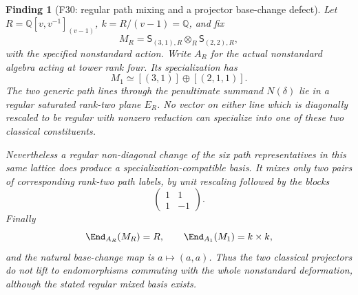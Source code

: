 \documentclass[11pt,a4paper]{article}
\newcommand{\Q}{\mathbb Q}\newcommand{\Z}{\mathbb Z}\newcommand{\C}{\mathbb C}\newcommand{\N}{\mathbb N}\newcommand{\F}{\mathbb F}
\newcommand{\fid}[1]{\textsf{#1}}\newcommand{\gate}[1]{\textsf{#1}}
\theoremstyle{named}\newtheorem{finding}{Finding}[section]
\theoremstyle{definition}\newtheorem{definition}[finding]{Definition}
\theoremstyle{remark}\newtheorem{remark}[finding]{Remark}
\begin{document}
\begin{finding}[\fid{F30}: regular path mixing and a projector base-change defect]\label{f:tower}
Let $R=\Q[v,v^{-1}]_{(v-1)}$, $k=R/(v-1)=\Q$, and fix
\[
 M_R=\mathsf S_{(3,1),R}\otimes_R\mathsf S_{(2,2),R},
\]
with the specified nonstandard action. Write $A_R$ for the actual
nonstandard algebra acting at tower rank four. Its specialization has
\[
 M_1\simeq[(3,1)]\oplus[(2,1,1)].
\]
The two generic path lines through the penultimate summand $N(\delta)$
lie in a regular saturated rank-two plane $E_R$. No vector on either
line which is diagonally rescaled to be regular with nonzero reduction
can specialize into one of these two classical constituents.

Nevertheless a regular non-diagonal change of the six path representatives
in this same lattice does produce a specialization-compatible basis.
It mixes only two pairs of corresponding rank-two path labels, by
unit rescaling followed by the blocks
\[
 \begin{pmatrix}1&1\\1&-1\end{pmatrix}.
\]
Finally
\[
 \End_{A_R}(M_R)=R,\qquad \End_{A_1}(M_1)=k\times k,
\]
and the natural base-change map is $a\mapsto(a,a)$. Thus the two
classical projectors do not lift to endomorphisms commuting with the
whole nonstandard deformation, although the stated regular mixed basis
exists.
\end{finding}
\end{document}
